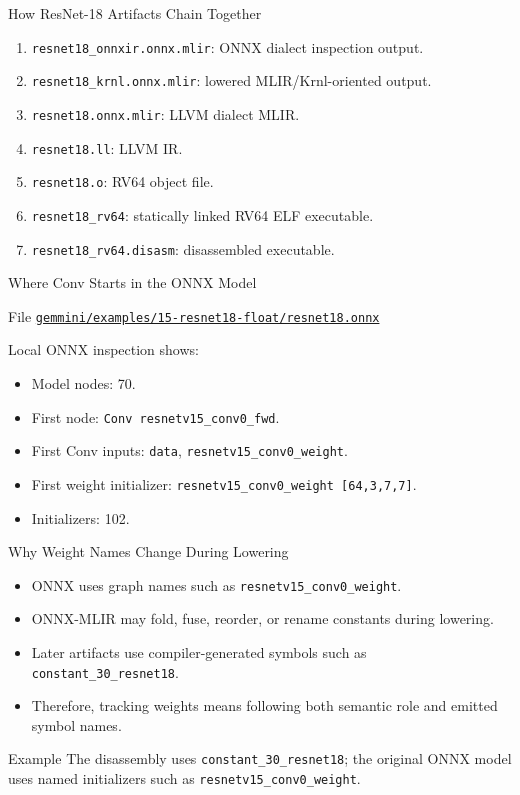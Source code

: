 \documentclass[aspectratio=169,10pt]{beamer}
\newcommand{\code}[1]{\texttt{\footnotesize #1}}
\newcommand{\repoRoot}{/home/lahcen/toolchains/onnx-mlir-xcompile/onnx-mlir}
\newcommand{\pathcode}[1]{\href{run:\repoRoot/#1}{\texttt{\scriptsize #1}}}
\begin{document}
\begin{frame}{How ResNet-18 Artifacts Chain Together}
  \begin{enumerate}
    \item \code{resnet18\_onnxir.onnx.mlir}: ONNX dialect inspection output.
    \item \code{resnet18\_krnl.onnx.mlir}: lowered MLIR/Krnl-oriented output.
    \item \code{resnet18.onnx.mlir}: LLVM dialect MLIR.
    \item \code{resnet18.ll}: LLVM IR.
    \item \code{resnet18.o}: RV64 object file.
    \item \code{resnet18\_rv64}: statically linked RV64 ELF executable.
    \item \code{resnet18\_rv64.disasm}: disassembled executable.
  \end{enumerate}
\end{frame}

\begin{frame}{Where Conv Starts in the ONNX Model}
  \begin{block}{File}
    \pathcode{gemmini/examples/15-resnet18-float/resnet18.onnx}
  \end{block}
  Local ONNX inspection shows:
  \begin{itemize}
    \item Model nodes: 70.
    \item First node: \code{Conv resnetv15\_conv0\_fwd}.
    \item First Conv inputs: \code{data}, \code{resnetv15\_conv0\_weight}.
    \item First weight initializer: \code{resnetv15\_conv0\_weight [64,3,7,7]}.
    \item Initializers: 102.
  \end{itemize}
\end{frame}

\begin{frame}{Why Weight Names Change During Lowering}
  \begin{itemize}
    \item ONNX uses graph names such as \code{resnetv15\_conv0\_weight}.
    \item ONNX-MLIR may fold, fuse, reorder, or rename constants during lowering.
    \item Later artifacts use compiler-generated symbols such as \code{constant\_30\_resnet18}.
    \item Therefore, tracking weights means following both semantic role and emitted symbol names.
  \end{itemize}
  \begin{block}{Example}
    The disassembly uses \code{constant\_30\_resnet18}; the original ONNX model uses named initializers such as \code{resnetv15\_conv0\_weight}.
  \end{block}
\end{frame}
\end{document}
